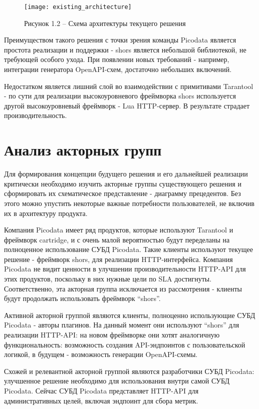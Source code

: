 \documentclass[times,numbers=noenddot]{itmo-student-thesis}
\begin{document}
\begin{figure}[!h]
	\caption*{Рисунок 1.2 -- Схема архитектуры текущего решения}\label{fig2}
	\centering
	\texttt{[image: existing\_architecture]}
\end{figure}


Преимуществом такого решения с точки зрения команды Picodata является простота реализации и поддержки - shors является небольшой библиотекой, не требующей особого ухода.
При появлении новых требований - например, интеграции генератора OpenAPI-схем, достаточно небольших включений.

Недостатком является лишний слой во взаимодействии с примитивами Tarantool - по сути для реализации высокоуровневого фреймворка shors используется другой высокоуровневый фреймворк - Lua HTTP-сервер.
В результате страдает производительность.

\section{Анализ акторных групп}\label{sec:analyze_actors}

Для формирования концепции будущего решения и его дальнейшей реализации критически необходимо изучить акторные группы существующего решения и сформировать их схематическое представление - диаграмму прецедентов.
Без этого можно упустить некоторые важные потребности пользователей, не включив их в архитектуру продукта.

Компания Picodata имеет ряд продуктов, которые используют Tarantool и фреймворк cartridge, и с очень малой вероятностью будут переделаны на полноценное использование СУБД Picodata.
Такие клиенты используют текущее решение - фреймворк shors, для реализации HTTP-интерфейса.
Компания Picodata не видит ценности в улучшении производительности HTTP-API для этих продуктов, поскольку в них нужные цели по SLA достигнуты.
Соответственно, эта акторная группа исключается из рассмотрения - клиенты будут продолжать использовать фреймворк “shors”.

Активной акторной группой являются клиенты, полноценно использующие СУБД Picodata - авторы плагинов.
На данный момент они используют “shors” для реализации HTTP-API: на новом фреймворке они хотят  аналогичную функциональность: возможность создания API-эндпоинтов с пользовательской логикой, в будущем - возможность генерации OpenAPI-схемы.

Схожей и релевантной акторной группой являются разработчики СУБД Picodata: улучшенное решение необходимо для использования внутри самой СУБД Picodata.
Сейчас СУБД Picodata представляет HTTP-API для административных целей, включая эндпоинт для сбора метрик.
\end{document}
